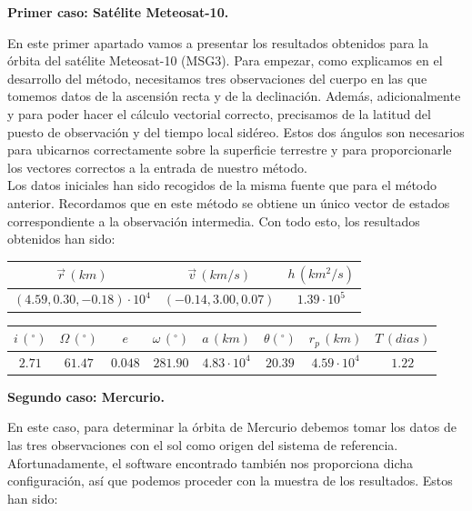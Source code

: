 \documentclass{article}
\numberwithin{equation}{section}
\begin{document}
\noindent\textbf{Primer caso: Satélite Meteosat-10.}

En este primer apartado vamos a presentar los resultados obtenidos para la órbita del satélite Meteosat-10 (MSG3). Para empezar, como explicamos en el desarrollo del método, necesitamos tres observaciones del cuerpo en las que tomemos datos de la ascensión recta y de la declinación. Además, adicionalmente y para poder hacer el cálculo vectorial correcto, precisamos de la latitud del puesto de observación y del tiempo local sidéreo. Estos dos ángulos son necesarios para ubicarnos correctamente sobre la superficie terrestre y para proporcionarle los vectores correctos a la entrada de nuestro método.\\

Los datos iniciales han sido recogidos de la misma fuente que para el método anterior. Recordamos que en este método se obtiene un único vector de estados correspondiente a la observación intermedia. Con todo esto, los resultados obtenidos han sido:

\begin{center}
    \centering
    \begin{tabular}{|c|c|c|}
    \hline
    $\overrightarrow{r}\, (km)$ & $\overrightarrow{v}\, (km/s)$ & $h\, ( km^{2}/s)$  \\ \hline
    $(4.59, 0.30, -0.18)\cdot10^4$ & $(-0.14, 3.00, 0.07)$ & $1.39 \cdot 10^{5}$\\ \hline
    \end{tabular}
\end{center}

\begin{center}
    \centering
    \begin{tabular}{|c|c|c|c|c|c|c|c|}
    \hline
     $i\, (^{\circ})$ & $\Omega\, (^\circ)$ & $e$ & $\omega\, (^\circ)$ & $a\, (km)$ & $\theta (^\circ)$ & $r_{p}\, (km)$ & $T\, (dias)$\\ \hline
    $2.71$ & $61.47$ & $ 0.048$ & $281.90$ & $4.83\cdot 10^{4}$ & $20.39$ & $4.59\cdot 10^{4}$ & $1.22$ \\ \hline
    \end{tabular}
\end{center}


\noindent\textbf{Segundo caso: Mercurio.}

En este caso, para determinar la órbita de Mercurio debemos tomar los datos de las tres observaciones con el sol como origen del sistema de referencia. Afortunadamente, el software encontrado también nos proporciona dicha configuración, así que podemos proceder con la muestra de los resultados. Estos han sido:
\end{document}
